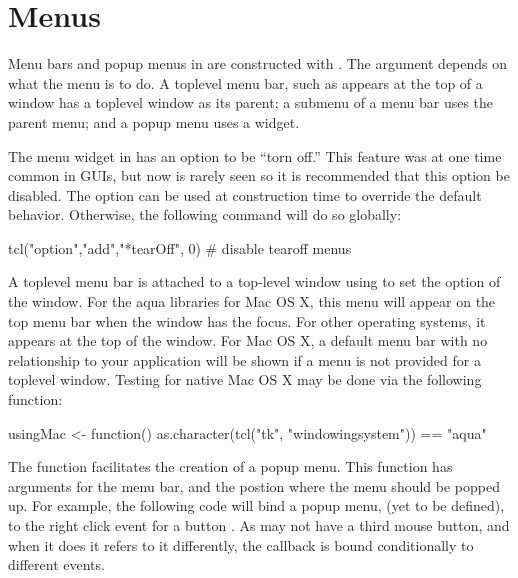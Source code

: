 \section{Menus}
\label{sec:tcltk:menus}

Menu bars and popup menus in \Tk\/ are constructed with
. The  argument depends on what the menu is
to do. A toplevel menu bar, such as appears at the top of a window has
a toplevel window as its parent; a submenu of a menu bar uses the
parent menu; and a popup menu uses a widget.  

The menu widget in \Tk\/ has an option to be ``torn off.'' This
feature was at one time common in GUIs, but now is rarely seen so it
is recommended that this option be disabled. The
 option can be used at construction time to
override the default behavior. Otherwise, the following command will
do so globally:
\begin{Schunk}
\begin{Sinput}
 tcl("option","add","*tearOff", 0)    # disable tearoff menus
\end{Sinput}
\end{Schunk}
%

A toplevel menu bar is attached to a top-level window using 
to set the  option of the window. For the aqua \TK\/
libraries for Mac OS X, this menu will appear on the top menu bar when
the window has the focus. For other operating systems, it appears at
the top of the window. For Mac OS X, a default menu bar with no
relationship to your application will be shown if a menu is not
provided for a toplevel window. Testing for native Mac OS X may be done via
the following function:
\begin{Schunk}
\begin{Sinput}
 usingMac <- function()  
   as.character(tcl("tk", "windowingsystem")) == "aqua"
\end{Sinput}
\end{Schunk}

The  function facilitates the creation of a popup
menu.  This function has arguments for the menu bar, and the postion
where the menu should be popped up. For example, the following code
will bind a popup menu,  (yet to be defined), to the right click event for a
button . As \OSX\/ may not have a third mouse button, and when
it does it refers to it differently, the callback is bound
conditionally to different events.


